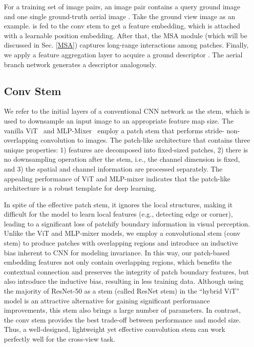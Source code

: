 \documentclass[sn-basic,iicol]{sn-jnl}
\theoremstyle{thmstyletwo}\newtheorem{example}{Example}\newtheorem{remark}{Remark}
\theoremstyle{thmstylethree}\newtheorem{definition}{Definition}
\begin{document}
For a training set  of  image pairs, an image pair  contains a query ground image  and one single ground-truth aerial image  .
Take the ground view image  as an example.  is fed to the conv stem to get a feature embedding, which is attached with a learnable position embedding. After that, the MSA module (which will be discussed in Sec. \ref{MSA}) captures long-range interactions among patches. Finally, we apply a feature aggregation layer to acquire a ground descriptor . The aerial branch network generates a descriptor  analogously.

\subsection{Conv Stem}\label{conv stem}

We refer to the initial layers of a conventional CNN network as the stem, which is used to downsample an input image to an appropriate feature map size. The vanilla ViT~\citep{ViT2021} and MLP-Mixer~\citep{MLP-Mixer2021} employ a patch stem that performs stride-  non-overlapping convolution to images. The patch-like architecture that contains three unique properties: 1) features are decomposed into fixed-sized patches, 2) there is no downsampling operation after the stem, i.e., the channel dimension is fixed, and 3) the spatial and channel information are processed separately. The appealing performance of ViT and MLP-mixer indicates that the patch-like architecture is a robust template for deep learning. 

In spite of the effective patch stem, it ignores the local structures, making it difficult for the model to learn local features (e.g., detecting edge or corner), leading to a significant loss of patchify boundary information in visual perception. 
Unlike the ViT and MLP-mixer models, we employ a convolutional stem (conv stem) to produce patches with overlapping regions and introduce an inductive bias inherent to CNN for modeling invariance. In this way, our patch-based embedding features not only contain overlapping regions, which benefits the contextual connection and preserves the integrity of patch boundary features, but also introduce the inductive bias, resulting in less training data. Although using the majority of ResNet-50 as a stem (called ResNet stem) in the “hybrid ViT” model is an attractive alternative for gaining significant performance improvements, this stem also brings a large number of parameters. In contrast, the conv stem provides the best trade-off between performance and model size. Thus, a well-designed, lightweight yet effective convolution stem can work perfectly well for the cross-view task.
\end{document}

